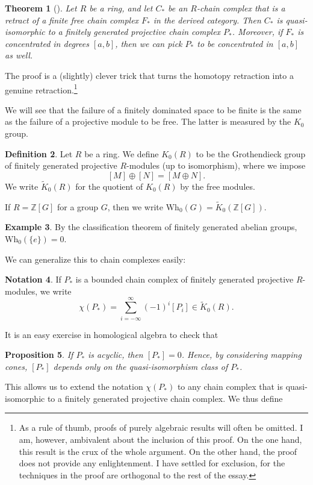 \documentclass[a4paper, 12pt]{article}
\newtheorem{thm}{Theorem}[section]
\newtheorem{prop}[thm]{Proposition}
\theoremstyle{definition}
\newtheorem{defi}[thm]{Definition}
\newtheorem{notation}[thm]{Notation}
\newtheorem{eg}[thm]{Example}
\newcommand\Z{\mathbb{Z}}
\newcommand\Wh{\mathrm{Wh}}
\newcommand\fakeqed{\pushQED{\qed}\qedhere}
\begin{document}
\begin{thm}[{\cite[Proposition 3.2]{ranicki}}]
  Let $R$ be a ring, and let $C_*$ be an $R$-chain complex that is a retract of a finite free chain complex $F_*$ in the derived category. Then $C_*$ is quasi-isomorphic to a finitely generated projective chain complex $P_*$. Moreover, if $F_*$ is concentrated in degrees $[a, b]$, then we can pick $P_*$ to be concentrated in $[a, b]$ as well.\fakeqed
\end{thm}
The proof is a (slightly) clever trick that turns the homotopy retraction into a genuine retraction.\footnote{As a rule of thumb, proofs of purely algebraic results will often be omitted. I am, however, ambivalent about the inclusion of this proof. On the one hand, this result is the crux of the whole argument. On the other hand, the proof does not provide any enlightenment. I have settled for exclusion, for the techniques in the proof are orthogonal to the rest of the essay.}

We will see that the failure of a finitely dominated space to be finite is the same as the failure of a projective module to be free. The latter is measured by the $K_0$ group.
\begin{defi}
  Let $R$ be a ring. We define $K_0(R)$ to be the Grothendieck group of finitely generated projective $R$-modules (up to isomorphism), where we impose
  \[
    [M] \oplus [N] = [M \oplus N].
  \]
  We write $\tilde{K}_0(R)$ for the quotient of $K_0(R)$ by the free modules.

  If $R = \Z[G]$ for a group $G$, then we write $\Wh_0(G) = \tilde{K}_0(\Z[G])$.
\end{defi}
\begin{eg}
  By the classification theorem of finitely generated abelian groups, $\Wh_0(\{e\}) = 0$.
\end{eg}
We can generalize this to chain complexes easily:
\begin{notation}
  If $P_*$ is a bounded chain complex of finitely generated projective $R$-modules, we write
  \[
    \chi(P_*) = \sum_{i = -\infty}^\infty (-1)^i [P_i] \in \tilde{K}_0(R).
  \]
\end{notation}

It is an easy exercise in homological algebra to check that
\begin{prop}
  If $P_*$ is acyclic, then $[P_*] = 0$. Hence, by considering mapping cones, $[P_*]$ depends only on the quasi-isomorphism class of $P_*$.\fakeqed
\end{prop}
This allows us to extend the notation $\chi(P_*)$ to any chain complex that is quasi-isomorphic to a finitely generated projective chain complex. We thus define
\end{document}
